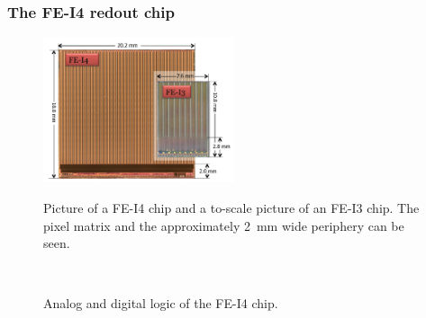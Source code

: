 \subsubsection{The FE-I4 redout chip}
\label{sec:FEI4}
\begin{figure}
\centering
{\includegraphics[width=0.5\textwidth]{Images/IBL_Paper/chapter04_Modules/FEI4.png}}
\caption{Picture of a FE-I4 chip and a to-scale picture of an FE-I3 chip. The pixel matrix and the approximately \SI{2}{\milli\meter} wide periphery can be seen.}
\label{fig:FEI4}


\end{figure}
\begin{figure}
\centering
{}
\\
\caption{Analog and digital logic of the FE-I4 chip.}
\label{fig:FEI4_circuit}
\end{figure}
